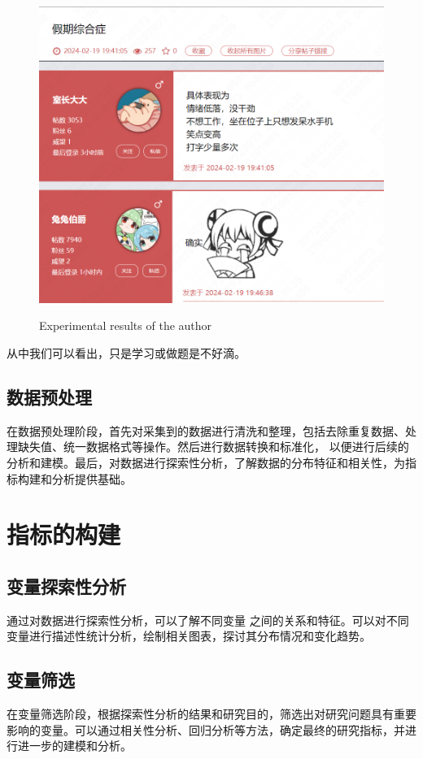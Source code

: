 \documentclass[a4paper,12pt]{article}
\begin{document}
\begin{figure}[H]
{  \includegraphics[scale=0.4]{4.png} \label{4} 
  }
  
  \caption{Experimental results of the author}
  \end{figure}

  从中我们可以看出，只是学习或做题是不好滴。
\subsection{数据预处理}

在数据预处理阶段，首先对采集到的数据进行清洗和整理，包括去除重复数据、处理缺失值、统一数据格式等操作。然后进行数据转换和标准化，
以便进行后续的分析和建模。最后，对数据进行探索性分析，了解数据的分布特征和相关性，为指标构建和分析提供基础。

\section{指标的构建}
\subsection{变量探索性分析}
通过对数据进行探索性分析，可以了解不同变量
之间的关系和特征。可以对不同变量进行描述性统计分析，绘制相关图表，探讨其分布情况和变化趋势。
\subsection{变量筛选}
在变量筛选阶段，根据探索性分析的结果和研究目的，筛选出对研究问题具有重要影响的变量。可以通过相关性分析、回归分析等方法，确定最终的研究指标，并进行进一步的建模和分析。
\end{document}
